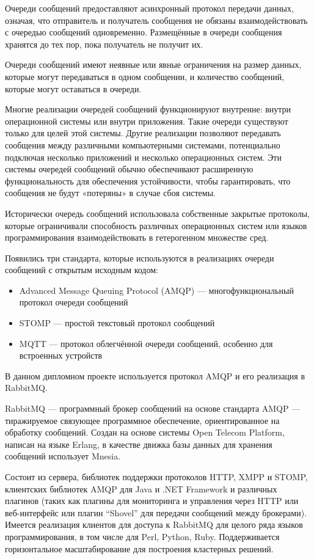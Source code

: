Очереди сообщений предоставляют асинхронный протокол передачи данных, означая, что отправитель и получатель сообщения не обязаны взаимодействовать с очередью сообщений одновременно. Размещённые в очереди сообщения хранятся до тех пор, пока получатель не получит их.

Очереди сообщений имеют неявные или явные ограничения на размер данных, которые могут передаваться в одном сообщении, и количество сообщений, которые могут оставаться в очереди.

Многие реализации очередей сообщений функционируют внутренне: внутри операционной системы или внутри приложения. Такие очереди существуют только для целей этой системы. Другие реализации позволяют передавать сообщения между различными компьютерными системами, потенциально подключая несколько приложений и несколько операционных систем. Эти системы очередей сообщений обычно обеспечивают расширенную функциональность для обеспечения устойчивости, чтобы гарантировать, что сообщения не будут «потеряны» в случае сбоя системы.

Исторически очередь сообщений использовала собственные закрытые протоколы, которые ограничивали способность различных операционных систем или языков программирования взаимодействовать в гетерогенном множестве сред.

Появились три стандарта, которые используются в реализациях очереди сообщений с открытым исходным кодом:

\begin{itemize}
    \item Advanced Message Queuing Protocol (AMQP) — многофункциональный протокол очереди сообщений
    \item STOMP  — простой текстовый протокол сообщений
    \item MQTT — протокол облегчённой очереди сообщений, особенно для встроенных устройств
\end{itemize}

В данном дипломном проекте используется протокол AMQP и его реализация в RabbitMQ.

RabbitMQ — программный брокер сообщений на основе стандарта AMQP — тиражируемое связующее программное обеспечение, ориентированное на обработку сообщений. Создан на основе системы Open Telecom Platform, написан на языке Erlang, в качестве движка базы данных для хранения сообщений использует Mnesia.

Состоит из сервера, библиотек поддержки протоколов HTTP, XMPP и STOMP, клиентских библиотек AMQP для Java и .NET Framework и различных плагинов (таких как плагины для мониторинга и управления через HTTP или веб-интерфейс или плагин ``Shovel'' для передачи сообщений между брокерами). Имеется реализация клиентов для доступа к RabbitMQ для целого ряда языков программирования, в том числе для Perl, Python, Ruby. Поддерживается горизонтальное масштабирование для построения кластерных решений.


